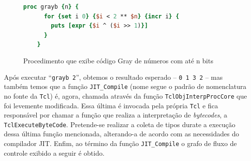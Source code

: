 \begin{figure}[h]
  \centering
  \begin{lstlisting}[language=Tcl]
    proc grayb {n} {
      for {set i 0} {$i < 2 ** $n} {incr i} {
        puts [expr {$i ^ ($i >> 1)}]
      }
    }
  \end{lstlisting}
  \caption{Procedimento que exibe código Gray de números com até n
    bits \label{fig:gray}}
\end{figure}

Após executar ``\verb!grayb 2!'', obtemos
o resultado esperado -- \verb!0 1 3 2! -- mas também temos que a função
\verb!JIT_Compile! (nome segue o padrão de nomenclatura no fonte da
\texttt{Tcl}) é, agora, chamada através da função
\verb!TclObjInterpProcCore! que foi levemente modificada.
Essa última é invocada pela própria
\texttt{Tcl} e fica responsável por chamar a função que realiza a
interpretação de \textit{bytecodes}, a
\verb!TclExecuteByteCode!. Pretende-se realizar a coleta de tipos
durate a execução dessa última função mencionada, alterando-a de
acordo com as necessidades do compilador JIT. Enfim, ao término
da função \verb!JIT_Compile! o grafo de fluxo de controle exibido a
seguir é obtido.


